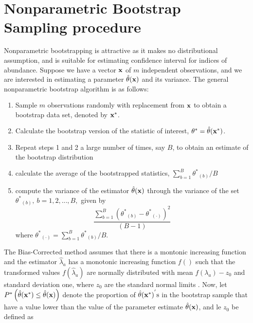 \documentclass[a4paper 12pt]{article}
\numberwithin{equation}{section}
\begin{document}
{\section{\large Nonparametric Bootstrap Sampling procedure}
\label{secAP:nonparametricbootstrap}
Nonparametric bootstrapping is attractive as it makes no distributional assumption, and is suitable for estimating confidence interval for indices of abundance. Suppose we have a vector $\bf x$ of $m$ independent observations, and we are interested in estimating a parameter $\hat{\theta} ({\bf x})$ and its variance. The general nonparametric bootstrap algorithm is as follows:
\begin{enumerate}
\item Sample $m$ observations randomly with replacement from ${\bf x}$ to obtain a bootstrap data set, denoted by ${\bf {x}^{*}}$.
\item Calculate the bootstrap version of the statistic of interest, ${\theta}^{*} = \hat{\theta}({\bf {x}^{*}})$.
\item Repeat steps 1 and 2 a large number of times, say $B$, to obtain an estimate of the bootstrap distribution
\item calculate the average of the bootstrapped statistics, $\sum_{b=1}^{B} {{\theta}^{*}}_{(b)}/B$ 
\item compute the variance of the estimator $\hat{\theta}({\bf x})$ through the variance of the set ${{\theta}^{*}}_{(b)}, \ b = 1,2,...,B,$ given by 
\begin{equation}
\frac{ \sum_{b=1}^{B} {\left({{\theta}^{*}}_{(b)} - {{\theta}^{*}}_{(\cdot)} \right)}^{2}  }{(B-1)} 
\end{equation}
where ${{\theta}^{*}}_{(\cdot)} = \sum_{b=1}^{B} {{\theta}^{*}}_{(b)}/B. $
\end{enumerate}
The Bias-Corrected method assumes that there is a montonic increasing function and the estimator $\hat{\lambda}_{a}$ has a monotonic increasing function $f()$ such that the transformed values $f(\hat{\lambda}_{a})$ are normally distributed with mean $f(\lambda_{a}) - z_{0}$ and standard deviation one, where $z_{0}$ are the standard normal limits \citep{puth2015variety, karlsson2009bootstrap}. Now, let $P^{*} \left(\hat{\theta} ({\bf x^{*}}) \leq \hat{\theta} ({\bf x}) \right) $ denote the proportion of $\hat{\theta} {({\bf x^{*}})}^{'} \mathrm{s}$ in the bootstrap sample that have a value lower than the value of the parameter estimate $\hat{\theta} ({\bf x})$, and le $z_{0}$ be defined as
\begin{equation}

\end{equation}}
\end{document}
